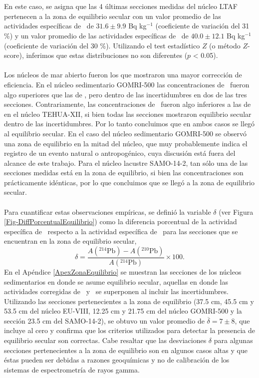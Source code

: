 \\
\\
En este caso, se asigna que las 4 últimas secciones medidas del núcleo LTAF pertenecen a la zona de equilibrio secular con un valor promedio de las actividades específicas de \PbCero\, de $31.6 \pm 9.9$ Bq kg$^{-1}$ (coeficiente de variación del 31 \%) y un valor promedio de las actividades específicas de \PbCuatro\, de $40.0 \pm 12.1$ Bq kg$^{-1}$ (coeficiente de variación del 30 \%). Utilizando el test estadístico $Z$ (o método $Z$-score), inferimos que estas distribuciones no son diferentes ($p$ < 0.05). 
\\
\\
Los núcleos de mar abierto fueron los que mostraron una mayor corrección de eficiencia. En el núcleo sedimentario GOMRI-500 las concentraciones de \PbCero\, fueron algo superiores que las de \PbCuatro, pero dentro de las incertidumbres en dos de las tres secciones. Contrariamente, las concentraciones de \PbCero\, fueron algo inferiores a las de \PbCuatro\, en el núcleo TEHUA-XII, si bien todas las secciones mostraron equilibrio secular dentro de las incertidumbres. Por lo tanto concluimos que en ambos casos se llegó al equilibrio secular. En el caso del núcleo sedimentario GOMRI-500 se observó una zona de equilibrio en la mitad del núcleo, que muy probablemente indica el registro de un evento natural o antropogénico, cuya discusión está fuera del alcance de este trabajo. Para el núcleo lacustre SAMO-14-2, tan sólo una de las secciones medidas está en la zona de equilibrio, si bien las concentraciones son prácticamente idénticas, por lo que concluimos que se llegó a la zona de equilibrio secular. 
\\
\\
Para cuantificar estas observaciones empíricas, se definió la variable $\delta$ (ver Figura \ref{Fig-DiffPorcentualEquilibrio}) como la diferencia porcentual  de  la  actividad  específica  de  \PbCero\, respecto a la actividad específica de \PbCuatro\, para las secciones que se encuentran en la zona de equilibrio secular, 
\begin{equation}
\delta = \dfrac{A(^{214}\text{Pb}) - A(^{210}\text{Pb}) }{A(^{214}\text{Pb}) } \times 100.
\end{equation}
En el Apéndice \ref{ApexZonaEquilibrio} se muestran las secciones de los núcleos sedimentarios en donde se asume equilibrio secular, aquellas en donde las actividades corregidas de \PbCero\, y \PbCuatro\, se superponen al incluir las incertidumbres. Utilizando las secciones pertenecientes a la zona de equilibrio (37.5 cm, 45.5 cm y 53.5 cm del núcleo EU-VIII, 12.25 cm y 21.75 cm del núcleo GOMRI-500 y la sección 23.5 cm del SAMO-14-2), se obtuvo un valor promedio de $\overline{\delta} = 7 \pm 8$, que incluye al cero y confirma que los criterios utilizados para detectar la presencia de equilibrio secular son correctas. Cabe resaltar que las desviaciones $\delta$ para algunas secciones pertenecientes a la zona de equilibrio son en algunos casos altas y que éstas pueden ser debidas a razones geoquímicas y no de calibración de los sistemas de espectrometría de rayos gamma. 
